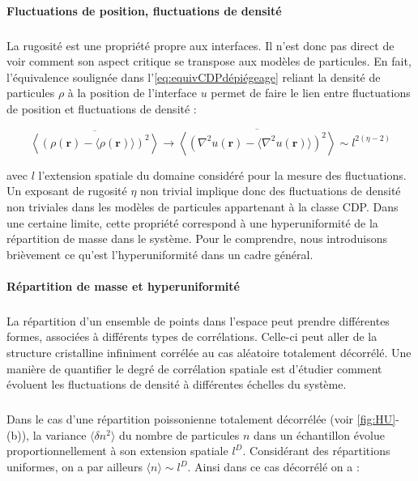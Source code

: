 \paragraph{Fluctuations de position, fluctuations de densité}

\subparagraph{}La rugosité est une propriété propre aux interfaces. Il n'est donc pas direct de voir comment son aspect critique se transpose aux modèles de particules. En fait, l'équivalence soulignée dans l'\autoref{eq:equivCDPdépiégeage} reliant la densité de particules $\rho$ à la position de l'interface $u$ permet de faire le lien entre fluctuations de position et fluctuations de densité :

\begin{equation}
	\overline{\left\langle (\rho(\mathbf{r}) - \langle \rho(\mathbf{r}) \rangle)^2\right\rangle} \rightarrow \overline{\left\langle (\nabla^2 u(\mathbf{r}) - \langle \nabla^2 u(\mathbf{r}) \rangle)^2\right\rangle} \sim l^{2(\eta-2)}
	\label{eq:MappingHyperuni}
\end{equation}

\noindent avec $l$ l'extension spatiale du domaine considéré pour la mesure des fluctuations. Un exposant de rugosité $\eta$ non trivial implique donc des fluctuations de densité non triviales dans les modèles de particules appartenant à la classe CDP. Dans une certaine limite, cette propriété correspond à une hyperuniformité de la répartition de masse dans le système. Pour le comprendre, nous introduisons brièvement ce qu'est l'hyperuniformité dans un cadre général.

\paragraph{Répartition de masse et hyperuniformité}

\subparagraph{}La répartition d'un ensemble de points dans l'espace peut prendre différentes formes, associées à différents types de corrélations. Celle-ci peut aller de la structure cristalline infiniment corrélée au cas aléatoire totalement décorrélé. Une manière de quantifier le degré de corrélation spatiale est d'étudier comment évoluent les fluctuations de densité à différentes échelles du système. 

\subparagraph{}Dans le cas d'une répartition poissonienne totalement décorrélée (voir \autoref{fig:HU}-(b)), la variance $\langle \delta n^2 \rangle$ du nombre de particules $n$ dans un échantillon évolue proportionnellement à son extension spatiale $l^D$. Considérant des répartitions uniformes, on a par ailleurs $\langle n \rangle \sim l^D$. Ainsi dans ce cas décorrélé on a :

